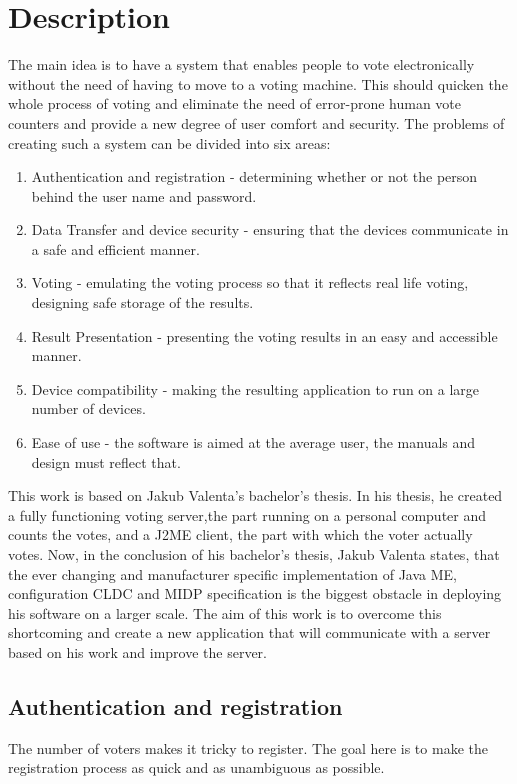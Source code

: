 \documentclass[11pt,twoside,a4paper]{book}
\begin{document}
\section{Description}
The main idea is to have a system that enables people to vote electronically without the need of having to move to a voting machine. This should quicken the whole process of voting and eliminate the need of error-prone human vote counters and provide a new degree of user comfort and security. The problems of creating such a system can be divided into six areas:
\begin{enumerate}
\item Authentication and registration -  determining whether or not the person behind the user name and password.
\item Data Transfer and device security - ensuring that the devices communicate in a safe and efficient manner.
\item Voting - 	emulating the voting process so that it reflects real life voting, designing safe storage of the results.
\item Result Presentation - presenting the voting results in an easy and accessible manner.
\item Device compatibility - making the resulting application to run on a large number of devices.
\item Ease of use - the software is aimed at the average user, the manuals and design must reflect that.
\end{enumerate}

This work is based on Jakub Valenta's bachelor's thesis\cite{bakalarkaJV}. In his thesis, he created a fully functioning voting server,the part running on a personal computer and counts the votes, and a J2ME client, the part with which the voter actually votes. Now, in the conclusion of his bachelor's thesis, Jakub Valenta \cite{bakalarkaJV} states, that the ever changing and manufacturer specific implementation of Java ME, configuration CLDC and MIDP specification is the biggest obstacle in deploying his software on a larger scale.  The aim of this work is to overcome this shortcoming and create a new application that will communicate with a server based on his work and improve the server. 

\subsection{Authentication and registration}
The number of voters makes it tricky to register. The goal here is to make the registration process as quick and as unambiguous as possible.
\end{document}
